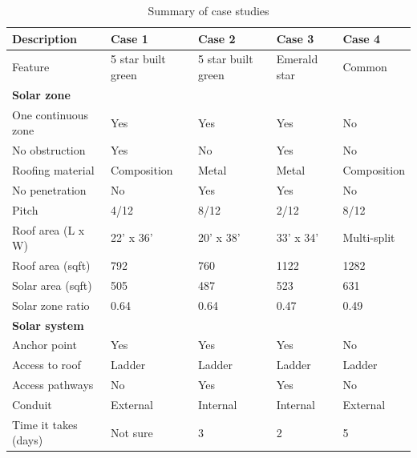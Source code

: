 \documentclass[]{article}
\begin{document}
\begin{table}[t]

\caption{\label{tab:unnamed-chunk-5}Summary of case studies}
\centering
\begin{tabular}{l|l|l|l|l}
\hline
Description & Case 1 & Case 2 & Case 3 & Case 4\\
\hline
Feature & 5 star built green & 5 star built green & Emerald star & Common\\
\hline
\multicolumn{5}{l}{\textbf{Solar zone}}\\
\hline
\hspace{1em}One continuous zone & Yes & Yes & Yes & No\\
\hline
\hspace{1em}No obstruction & Yes & No & Yes & No\\
\hline
\hspace{1em}Roofing material & Composition & Metal & Metal & Composition\\
\hline
\hspace{1em}No penetration & No & Yes & Yes & No\\
\hline
\hspace{1em}Pitch & 4/12 & 8/12 & 2/12 & 8/12\\
\hline
\hspace{1em}Roof area (L x W) & 22' x 36' & 20' x 38' & 33' x 34' & Multi-split\\
\hline
\hspace{1em}Roof area (sqft) & 792 & 760 & 1122 & 1282\\
\hline
\hspace{1em}Solar area (sqft) & 505 & 487 & 523 & 631\\
\hline
\hspace{1em}Solar zone ratio & 0.64 & 0.64 & 0.47 & 0.49\\
\hline
\multicolumn{5}{l}{\textbf{Solar system}}\\
\hline
\hspace{1em}Anchor point & Yes & Yes & Yes & No\\
\hline
\hspace{1em}Access to roof & Ladder & Ladder & Ladder & Ladder\\
\hline
\hspace{1em}Access pathways & No & Yes & Yes & No\\
\hline
\hspace{1em}Conduit & External & Internal & Internal & External\\
\hline
\hspace{1em}Time it takes (days) & Not sure & 3 & 2 & 5\\

\end{tabular}
\end{table}
\end{document}
